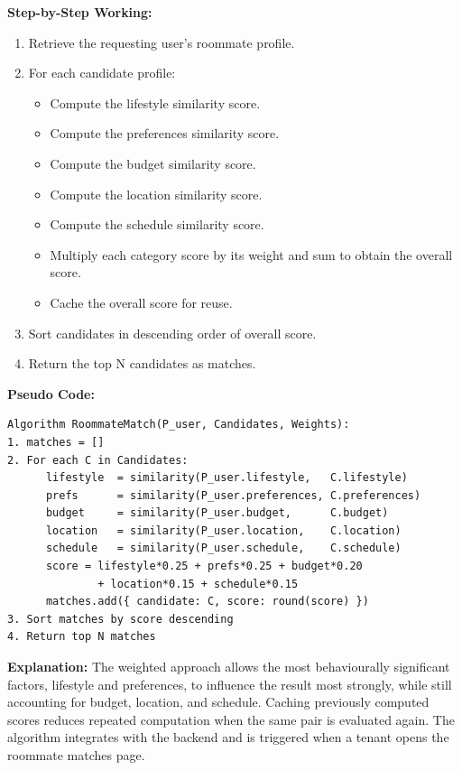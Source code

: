 \textbf{Step-by-Step Working:}

\begin{enumerate}
    \item Retrieve the requesting user's roommate profile.
    \item For each candidate profile:
    \begin{itemize}
        \item Compute the lifestyle similarity score.
        \item Compute the preferences similarity score.
        \item Compute the budget similarity score.
        \item Compute the location similarity score.
        \item Compute the schedule similarity score.
        \item Multiply each category score by its weight and sum to obtain the overall score.
        \item Cache the overall score for reuse.
    \end{itemize}
    \item Sort candidates in descending order of overall score.
    \item Return the top N candidates as matches.
\end{enumerate}

\textbf{Pseudo Code:}

\begin{verbatim}
Algorithm RoommateMatch(P_user, Candidates, Weights):
1. matches = []
2. For each C in Candidates:
      lifestyle  = similarity(P_user.lifestyle,   C.lifestyle)
      prefs      = similarity(P_user.preferences, C.preferences)
      budget     = similarity(P_user.budget,      C.budget)
      location   = similarity(P_user.location,    C.location)
      schedule   = similarity(P_user.schedule,    C.schedule)
      score = lifestyle*0.25 + prefs*0.25 + budget*0.20
              + location*0.15 + schedule*0.15
      matches.add({ candidate: C, score: round(score) })
3. Sort matches by score descending
4. Return top N matches
\end{verbatim}

\textbf{Explanation:} The weighted approach allows the most behaviourally significant factors, lifestyle and preferences, to influence the result most strongly, while still accounting for budget, location, and schedule. Caching previously computed scores reduces repeated computation when the same pair is evaluated again. The algorithm integrates with the backend and is triggered when a tenant opens the roommate matches page.

